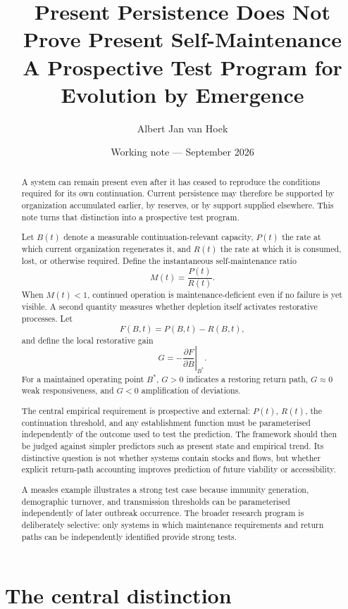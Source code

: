 \documentclass[11pt,a4paper]{article}
\title{\textbf{Present Persistence Does Not Prove Present Self-Maintenance}\\
\large A Prospective Test Program for Evolution by Emergence}
\author{Albert Jan van Hoek}
\date{Working note --- September 2026}
\begin{document}
\maketitle

\begin{abstract}
A system can remain present even after it has ceased to reproduce the conditions required for its own continuation. Current persistence may therefore be supported by organization accumulated earlier, by reserves, or by support supplied elsewhere. This note turns that distinction into a prospective test program.

Let $B(t)$ denote a measurable continuation-relevant capacity, $P(t)$ the rate at which current organization regenerates it, and $R(t)$ the rate at which it is consumed, lost, or otherwise required. Define the instantaneous self-maintenance ratio
\[
M(t)=\frac{P(t)}{R(t)}.
\]
When $M(t)<1$, continued operation is maintenance-deficient even if no failure is yet visible. A second quantity measures whether depletion itself activates restorative processes. Let
\[
F(B,t)=P(B,t)-R(B,t),
\]
and define the local restorative gain
\[
G
=
-\left.
\frac{\partial F}{\partial B}
\right|_{B^\ast}.
\]
For a maintained operating point $B^\ast$, $G>0$ indicates a restoring return path, $G\approx0$ weak responsiveness, and $G<0$ amplification of deviations.

The central empirical requirement is prospective and external: $P(t)$, $R(t)$, the continuation threshold, and any establishment function must be parameterised independently of the outcome used to test the prediction. The framework should then be judged against simpler predictors such as present state and empirical trend. Its distinctive question is not whether systems contain stocks and flows, but whether explicit return-path accounting improves prediction of future viability or accessibility.

A measles example illustrates a strong test case because immunity generation, demographic turnover, and transmission thresholds can be parameterised independently of later outbreak occurrence. The broader research program is deliberately selective: only systems in which maintenance requirements and return paths can be independently identified provide strong tests.
\end{abstract}

\section{The central distinction}
\end{document}
